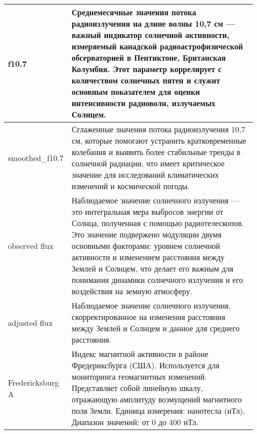 \begin{longtable}{|l|p{12cm}|}
	\hline
	f10.7                 & Среднемесячные значения потока радиоизлучения на длине волны 10,7 см — важный индикатор солнечной активности, измеряемый канадской радиоастрофизической обсерваторией в Пентиктоне, Британская Колумбия. Этот параметр коррелирует с количеством солнечных пятен и служит основным показателем для оценки интенсивности радиоволн, излучаемых Солнцем.                                                                                                                                                           \\
	\hline
	smoothed\_f10.7       & Сглаженные значения потока радиоизлучения 10,7 см, которые помогают устранить кратковременные колебания и выявить более стабильные тренды в солнечной радиации, что имеет критическое значение для исследований климатических изменений и космической погоды.                                                                                                                                                                                                                                                    \\
	\hline
	observed flux         & Наблюдаемое значение солнечного излучения — это интегральная мера выбросов энергии от Солнца, полученная с помощью радиотелескопов. Это значение подвержено модуляции двумя основными факторами: уровнем солнечной активности и изменением расстояния между Землей и Солнцем, что делает его важным для понимания динамики солнечного излучения и его воздействия на земную атмосферу.                                                                                                                           \\
	\hline
	adjusted flux         & Наблюдаемое значение солнечного излучения, скорректированное на изменения расстояния между Землей и Солнцем и данное для среднего расстояния.                                                                                                                                                                                                                                                                                                                                                                    \\
	\hline
	Fredericksburg A      & Индекс магнитной активности в районе Фредериксбурга (США). Используется для мониторинга геомагнитных изменений. Представляет собой линейную шкалу, отражающую амплитуду возмущений магнитного поля Земли. Единица измерения: нанотесла (нТл). Диапазон значений: от 0 до 400 нТл.                                                                                                                                                                                                                                \\

\end{longtable}
